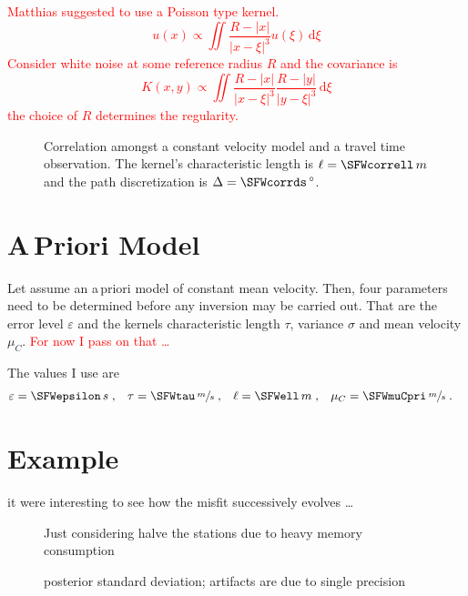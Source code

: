 \documentclass[11pt]{article}
\newcommand\worries[1]{\textcolor{red}{#1}}
\begin{document}
\worries{Matthias suggested to use a Poisson type kernel.
\begin{equation}
    u(x) \propto \iint \frac{R-|x|}{|x-\xi|^3} u(\xi) \, \mathrm d \xi
\end{equation}
Consider white noise at some reference radius $R$ and the covariance is
\begin{equation}
    K(x,y) \propto \iint \frac{R-|x|}{|x-\xi|^3} \frac{R-|y|}{|y-\xi|^3} \, \mathrm d \xi
\end{equation}
the choice of $R$ determines the regularity. }


\begin{figure}
    
    \centering
    
    \caption{Correlation amongst a constant velocity model and a travel time observation.
        The kernel's characteristic length is $\ell=\SFWcorrell\,m$ and the path discretization is $\Delta = \SFWcorrds\,{}^\circ$. }
    \label{fig:correlation}
\end{figure}


\section{A\,Priori Model}

Let assume an a\,priori model of constant mean velocity.
Then, four parameters need to be determined before any inversion may be carried out.
That are the error level $\varepsilon$ and the kernels characteristic length $\tau$, variance $\sigma$ and mean velocity $\mu_C$.
\worries{For now I pass on that \dots }

The values I use are
\begin{align}
    \varepsilon &= \SFWepsilon \, s \;,&
    \tau &= \SFWtau \, \sfrac ms \;,&
    \ell &= \SFWell \, m \;,&
    \mu_C &= \SFWmuCpri \, \sfrac ms \;.
\end{align}


\section{Example}

it were interesting to see how the misfit successively evolves \dots
\begin{figure}
    \centering
    
    \caption{Just considering halve the stations due to heavy memory consumption }
    \label{fig:example}
\end{figure}

\begin{figure}
    \centering
    
    \caption{posterior standard deviation; artifacts are due to single precision }
    \label{fig:example_var}
\end{figure}
\end{document}
